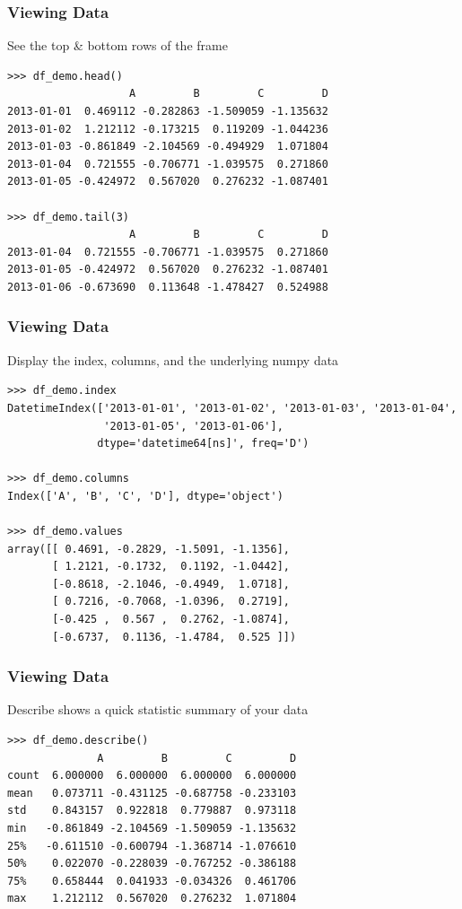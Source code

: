 \begin{frame}[fragile]\frametitle{Viewing Data}
See the top \& bottom rows of the frame
\begin{lstlisting}
>>> df_demo.head()
                   A         B         C         D
2013-01-01  0.469112 -0.282863 -1.509059 -1.135632
2013-01-02  1.212112 -0.173215  0.119209 -1.044236
2013-01-03 -0.861849 -2.104569 -0.494929  1.071804
2013-01-04  0.721555 -0.706771 -1.039575  0.271860
2013-01-05 -0.424972  0.567020  0.276232 -1.087401

>>> df_demo.tail(3)
                   A         B         C         D
2013-01-04  0.721555 -0.706771 -1.039575  0.271860
2013-01-05 -0.424972  0.567020  0.276232 -1.087401
2013-01-06 -0.673690  0.113648 -1.478427  0.524988
\end{lstlisting}
\end{frame}

\begin{frame}[fragile]\frametitle{Viewing Data}
Display the index, columns, and the underlying numpy data
\begin{lstlisting}
>>> df_demo.index
DatetimeIndex(['2013-01-01', '2013-01-02', '2013-01-03', '2013-01-04',
               '2013-01-05', '2013-01-06'],
              dtype='datetime64[ns]', freq='D')

>>> df_demo.columns
Index(['A', 'B', 'C', 'D'], dtype='object')

>>> df_demo.values
array([[ 0.4691, -0.2829, -1.5091, -1.1356],
       [ 1.2121, -0.1732,  0.1192, -1.0442],
       [-0.8618, -2.1046, -0.4949,  1.0718],
       [ 0.7216, -0.7068, -1.0396,  0.2719],
       [-0.425 ,  0.567 ,  0.2762, -1.0874],
       [-0.6737,  0.1136, -1.4784,  0.525 ]])
\end{lstlisting}
\end{frame}


\begin{frame}[fragile]\frametitle{Viewing Data}
Describe shows a quick statistic summary of your data
\begin{lstlisting}
>>> df_demo.describe()
              A         B         C         D
count  6.000000  6.000000  6.000000  6.000000
mean   0.073711 -0.431125 -0.687758 -0.233103
std    0.843157  0.922818  0.779887  0.973118
min   -0.861849 -2.104569 -1.509059 -1.135632
25%   -0.611510 -0.600794 -1.368714 -1.076610
50%    0.022070 -0.228039 -0.767252 -0.386188
75%    0.658444  0.041933 -0.034326  0.461706
max    1.212112  0.567020  0.276232  1.071804
\end{lstlisting}
\end{frame}

